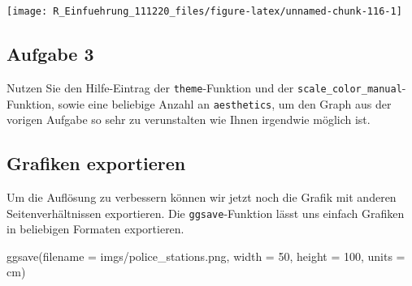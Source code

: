 \documentclass[
]{book}
\newenvironment{Shaded}{\begin{snugshade}}{\end{snugshade}}
\newcommand{\AttributeTok}[1]{\textcolor[rgb]{0.77,0.63,0.00}{#1}}
\newcommand{\DecValTok}[1]{\textcolor[rgb]{0.00,0.00,0.81}{#1}}
\newcommand{\FunctionTok}[1]{\textcolor[rgb]{0.00,0.00,0.00}{#1}}
\newcommand{\NormalTok}[1]{#1}
\newcommand{\StringTok}[1]{\textcolor[rgb]{0.31,0.60,0.02}{#1}}
\begin{document}
\begin{center}\texttt{[image: R\_Einfuehrung\_111220\_files/figure-latex/unnamed-chunk-116-1]} \end{center}

\hypertarget{aufgabe-3-2}{%
\subsection{Aufgabe 3}\label{aufgabe-3-2}}

Nutzen Sie den Hilfe-Eintrag der \texttt{theme}-Funktion und der \texttt{scale\_color\_manual}-Funktion, sowie eine beliebige Anzahl an \texttt{aesthetics}, um den Graph aus der vorigen Aufgabe so sehr zu verunstalten wie Ihnen irgendwie möglich ist.

\hypertarget{grafiken-exportieren}{%
\subsection{Grafiken exportieren}\label{grafiken-exportieren}}

Um die Auflösung zu verbessern können wir jetzt noch die Grafik mit anderen Seitenverhältnissen exportieren. Die \texttt{ggsave}-Funktion lässt uns einfach Grafiken in beliebigen Formaten exportieren.

\begin{Shaded}
\begin{Highlighting}[]
\FunctionTok{ggsave}\NormalTok{(}\AttributeTok{filename =} \StringTok{\textquotesingle{}imgs/police\_stations.png\textquotesingle{}}\NormalTok{,}
      \AttributeTok{width =} \DecValTok{50}\NormalTok{,}
      \AttributeTok{height =} \DecValTok{100}\NormalTok{,}
      \AttributeTok{units =} \StringTok{\textquotesingle{}cm\textquotesingle{}}\NormalTok{)}
\end{Highlighting}
\end{Shaded}
\end{document}
